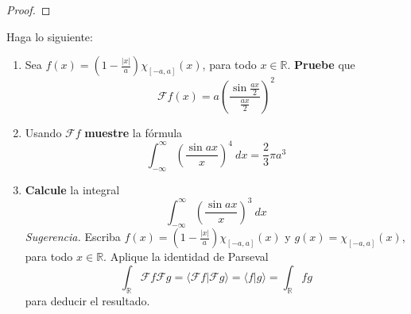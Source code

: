 \documentclass[12pt]{report}
\theoremstyle{largebreak}
\newcommand\abs[1]{\ensuremath{\left|#1\right|}}
\newcommand\pint[2]{\ensuremath{\langle#1| #2\rangle}}
\newcommand{\fou}[1]{\ensuremath{\mathcal{F}#1}}
\begin{document}
    \begin{proof}
        
    \end{proof}

    \begin{excer}
        Haga lo siguiente:
        \begin{enumerate}
            \item Sea $f(x)=\left(1-\frac{\abs{x}}{a}\right)\chi_{[-a,a]}(x)$, para todo $x\in\mathbb{R}$. \textbf{Pruebe } que
            \begin{equation*}
                \fou{f}(x)=a\left(\frac{\sin\frac{ax}{2}}{\frac{ax}{2}}\right)^2
            \end{equation*}
            \item Usando $\fou{f}$ \textbf{muestre} la fórmula
            \begin{equation*}
                \int_{-\infty }^{\infty}\left(\frac{\sin ax}{x} \right)^4\:dx=\frac{2}{3}\pi a^3
            \end{equation*}
            \item \textbf{Calcule} la integral
            \begin{equation*}
                \int_{-\infty}^{\infty}\left(\frac{\sin ax}{x}\right)^3\:dx
            \end{equation*}
            \textit{Sugerencia.} Escriba $f(x)=\left(1-\frac{\abs{x}}{a} \right)\chi_[-a,a](x)$ y $g(x)=\chi_{[-a,a]}(x)$, para todo $x\in\mathbb{R}$. Aplique la identidad de Parseval
            \begin{equation*}
                \int_\mathbb{R}\fou{f}\fou{g}=\pint{\fou{f}}{\fou{g}}=\pint{f}{g}=\int_{\mathbb{R}}fg
            \end{equation*}
            para deducir el resultado.
        \end{enumerate}
    \end{excer}

    \begin{sol}
        
    \end{sol}
\end{document}
